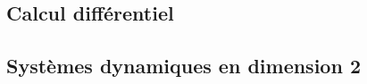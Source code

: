 \subsection{Calcul différentiel}













\subsection{Systèmes dynamiques en dimension 2}

% 



